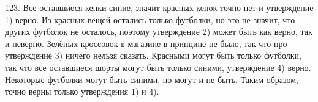 123. Все оставшиеся кепки синие, значит красных кепок точно нет и утверждение 1) верно. Из красных вещей остались только футболки, но это не значит, что других футболок не осталось, поэтому утверждение 2) может быть как верно, так и неверно. Зелёных кроссовок в магазине в принципе не было, так что про утверждение 3) ничего нельзя сказать. Красными могут быть только футболки, так что все оставшиеся шорты могут быть только синими, утверждение 4) верно. Некоторые футболки могут быть синими, но могут и не быть. Таким образом, точно верны только утверждения 1) и 4).\\
